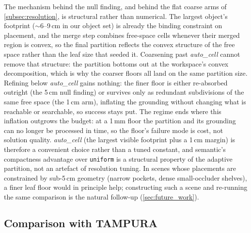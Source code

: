 The mechanism behind the null finding, and behind the flat coarse arms of
\cref{subsec:resolution}, is structural rather than numerical. The largest
object's footprint ($\sim$6--9\,cm in our object set) is already the
binding constraint on placement, and the merge step combines free-space
cells whenever their merged region is convex, so the final partition
reflects the convex structure of the free space rather than the leaf size
that seeded it. Coarsening past \emph{auto\_cell} cannot remove that
structure: the partition bottoms out at the workspace's convex
decomposition, which is why the coarser floors all land on the same
partition size. Refining below \emph{auto\_cell} gains nothing: the finer
floor is either re-absorbed outright (the 5\,cm null finding) or survives
only as redundant subdivisions of the same free space (the 1\,cm arm),
inflating the grounding without changing what is reachable or searchable,
so success stays put. The regime ends where this inflation outgrows the
budget: at a 1\,mm floor the partition and its grounding can no longer be
processed in time, so the floor's failure mode is cost, not solution
quality. \emph{auto\_cell} (the largest visible footprint plus a 1\,cm
margin) is therefore a convenient choice rather than a tuned constant, and
semantic's compactness advantage over \texttt{uniform} is a structural
property of the adaptive partition, not an artefact of resolution tuning.
In scenes whose placements are constrained by sub-5\,cm geometry (narrow
pockets, dense small-occluder shelves), a finer leaf floor would in
principle help; constructing such a scene and re-running the same
comparison is the natural follow-up (\cref{sec:future_work}).

\subsection{Comparison with TAMPURA}
\label{subsec:tampura}


